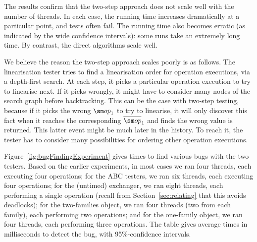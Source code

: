 

%
The results confirm that the two-step approach does not scale well with the
number of threads.  In each case, the running time increases dramatically at a
particular point, and tests often fail.  The running time also becomes erratic
(as indicated by the wide confidence intervals): some runs take an extremely
long time.  By contrast, the direct algorithms scale well.

We believe the reason the two-step approach scales poorly is as follows.  The
linearisation tester tries to find a linearisation order for operation
executions, via a depth-first search.  At each step, it picks a particular
operation execution to try to linearise next.  If it picks wrongly, it might
have to consider many nodes of the search graph before backtracking.  This can
be the case with two-step testing, because if it picks the wrong $\op_1$ to try
to linearise, it will only discover this fact when it reaches the
corresponding $\overline{\op}_1$ and finds the wrong value is returned.  This
latter event might be much later in the history.  To reach it, the tester has
to consider many possibilities for ordering other operation executions.


Figure~\ref{fig:bugFindingExperiment} gives times to find various bugs with
the two testers.  Based on the earlier experiments, in most cases we ran four
threads, each executing four operations; for the ABC testers, we ran six
threads, each executing four operations; for the (untimed) exchanger, we ran
eight threads, each performing a single operation (recall from
Section~\ref{sec:relating} that this avoids deadlocks); for the two-families
object, we ran four threads (two from each family), each performing two
operations; and for the one-family object, we ran four threads, each
performing three operations.  The table gives average times in milliseconds to
detect the bug, with 95\%-confidence intervals.


